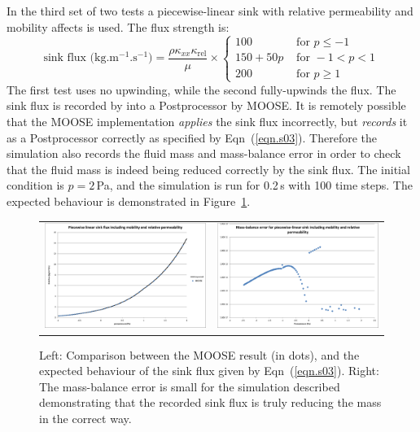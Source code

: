 \documentclass[]{scrreprt}
\begin{document}
\noindent In the third set of two tests a piecewise-linear sink with relative
permeability and mobility affects is used.  The flux strength is:
\begin{equation}
\mbox{sink flux (kg.m$^{-1}$.s$^{-1}$)} = 
\frac{\rho\kappa_{xx}\kappa_{\mathrm{rel}}}{\mu}
\times \left\{
\begin{array}{ll}
100 & \mbox{ for } p \leq -1 \\
150+50p& \mbox{ for } -1<p<1 \\
200 & \mbox{ for } p\geq 1 
\end{array}
\right.
\label{eqn.s03}
\end{equation}
The first test uses no upwinding, while the second fully-upwinds the flux.
The sink flux is recorded by into a Postprocessor by MOOSE.  It is
remotely possible that the MOOSE implementation {\em applies} the sink
flux incorrectly, but {\em records} it as a Postprocessor correctly as
specified by Eqn~(\ref{eqn.s03}).  Therefore the simulation also
records the fluid mass and mass-balance error in order to check that
the fluid mass is indeed being reduced correctly by the sink flux.
The initial condition is $p=2$\,Pa, and the simulation is run for
0.2\,s with 100 time steps.  The expected behaviour is demonstrated in
Figure~\ref{s03.fig}.

\begin{figure}[htb]
\centering
\begin{tabular}{cc}
\includegraphics[width=7cm]{s03.eps} &
\includegraphics[width=7cm]{s03_mass_bal.eps}
\end{tabular}
\caption{Left: Comparison between the MOOSE result (in dots), and the
  expected behaviour of the sink flux given by Eqn~(\ref{eqn.s03}).
  Right: The mass-balance error is small for the simulation described
  demonstrating that the recorded sink flux is truly reducing the mass
  in the correct way.}
\label{s03.fig}
\end{figure}
\end{document}
